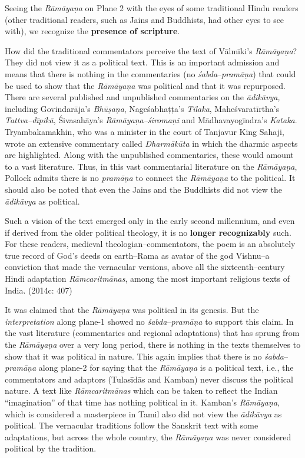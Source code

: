 \begin{myquote}
Seeing the \textit{Rāmāyaṇa} on Plane 2 with the eyes of some traditional Hindu readers (other traditional readers, such as Jains and Buddhists, had other eyes to see with), we recognize the \textbf{presence of scripture}.
\end{myquote}

How did the traditional commentators perceive the text of Vālmīki’s \textit{Rāmāyaṇa}? They did not view it as a political text. This is an important admission and means that there is nothing in the commentaries (no\textit{ śabda}–\textit{pramāṇa}) that could be used to show that the \textit{Rāmāyaṇa }was political and that it was repurposed. There are several published and unpublished commentaries on the \textit{ādikāvya,} including Govindarāja’s \textit{Bhūṣaṇa}, Nageśabhaṭṭa’s \textit{Tilaka}, Maheśvaratīrtha’s \textit{Tattva–dīpikā}, Śivasahāya’s \textit{Rāmāyaṇa–śiromaṇi} and Mādhavayogīndra’s \textit{Kataka}. Tryambakamakhin, who was a minister in the court of Tanjavur King Sahaji, wrote an extensive commentary called \textit{Dharmākūta }in which the dharmic aspects are highlighted. Along with the unpublished commentaries, these would amount to a vast literature. Thus, in this vast commentarial literature on the \textit{Rāmāyaṇa}, Pollock admits there is no \textit{pramāṇa} to connect the \textit{Rāmāyaṇa }to the political. It should also be noted that even the Jains and the Buddhists did not view the\textit{ ādikāvya} as political.

\begin{myquote}
Such a vision of the text emerged only in the early second millennium, and even if derived from the older political theology, it is no \textbf{longer recognizably} such. For these readers, medieval theologian–commentators, the poem is an absolutely true record of God’s deeds on earth–Rama as avatar of the god Vishnu–a conviction that made the vernacular versions, above all the sixteenth–century Hindi adaptation \textit{Rāmcaritmānas}, among the most important religious texts of India. (2014c: 407)
\end{myquote}

It was claimed that the \textit{Rāmāyaṇa }was political in its genesis. But the \textit{interpretation} along plane-1 showed no \textit{śabda}–\textit{pramāṇa }to support this claim. In the vast literature (commentaries and regional adaptations) that has sprung from the \textit{Rāmāyaṇa }over a very long period, there is nothing in the texts themselves to show that it was political in nature. This again implies that there is no \textit{śabda}–\textit{pramāṇa} along plane-2 for saying that the \textit{Rāmāyaṇa }is a political text, i.e., the commentators and adaptors (Tulasīdās and Kamban) never discuss the political nature. A text like \textit{Rāmcaritmānas} which can be taken to reflect the Indian “imagination” of that time has nothing political in it. Kamban’s\textit{ Rāmāyaṇa}, which is considered a masterpiece in Tamil also did not view the \textit{ādikāvya }as political. The vernacular traditions follow the Sanskrit text with some adaptations, but across the whole country, the \textit{Rāmāyaṇa} was never considered political by the tradition.

